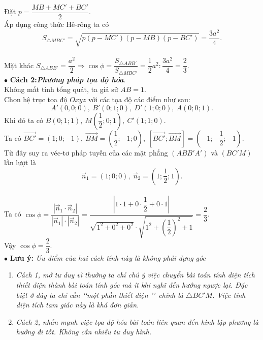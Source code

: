 \begin{ex}
{{}
\noindent
Đặt $p=\dfrac{MB+MC'+BC'}{2}$. \\
Áp dụng công thức Hê-rông ta có $$S_{\triangle MBC'}=\sqrt{p(p-MC')(p-MB)(p-BC')}=\dfrac{3a^2}{4}.$$
\\
Mặt khác $S_{\triangle ABB'}=\dfrac{a^2}{2}\Rightarrow \cos\phi =\dfrac{S_{\triangle ABB'}}{S_{\triangle MBC'}}=\dfrac{1}{2}a^2:\dfrac{3a^2}{4}=\dfrac{2}{3}$.\\
$\bullet$ \textbf{Cách 2:}\textbf{\textit{Phương pháp tọa độ hóa}}.\\
Không mất tính tổng quát, ta giả sử $AB=1$.\\
Chọn hệ trục tọa độ $Oxyz$ với các tọa độ các điểm như sau: $$A'(0,0;0),\ B'(0;1;0),\ D'(1;0;0),\ A(0;0;1).$$
Khi đó ta có $B(0;1;1),\ M\left(\dfrac{1}{2};0;1\right),\ C'(1;1;0)$.\\
Ta có $\overrightarrow{BC'}=(1;0;-1),\ \overrightarrow{BM}=\left(\dfrac{1}{2};-1;0\right),\ \left[\overrightarrow{BC'};\overrightarrow{BM}\right]=\left(-1;-\dfrac{1}{2};-1\right)$.\\
Từ đây suy ra véc-tơ pháp tuyến của các mặt phẳng $(ABB'A')$ và $(BC'M)$ lần lượt là $$\overrightarrow{n}_1=(1;0;0),\ \overrightarrow{n}_2=\left(1;\dfrac{1}{2};1\right).$$ \\
Ta có $\cos\phi =\dfrac{\left|\overrightarrow{n}_1\cdot\overrightarrow{n}_2\right|}{|\overrightarrow{n}_1|\cdot|\overrightarrow{n}_2|}=\dfrac{\left|1\cdot 1+0\cdot\dfrac{1}{2}+0\cdot 1\right|}{\sqrt{1^2+0^2+0^2}\cdot\sqrt{1^2+\left(\dfrac{1}{2}\right)^2+1}}=\dfrac{2}{3}$.\\
Vậy $\cos\phi=\dfrac{2}{3}$.\\
$\bullet$ \textbf{Lưu ý: }\textit{Ưu điểm của hai cách tính này là không phải dựng góc} 
\begin{enumerate}
\item \textit{Cách 1, mở tư duy vì thường ta chỉ chú ý việc chuyển bài toán tính diện tích thiết diện thành bài toán tính góc mà ít khi nghĩ đến hướng ngược lại. Đặc biệt ở đây ta chỉ cần \lq\lq một phần thiết diện \rq\rq\ chính là $\triangle BC'M$. Việc tính diện tích tam giác này là khá đơn giản.}
\item \textit{Cách 2, nhấn mạnh việc tọa độ hóa bài toán liên quan đến hình lập phương là hướng đi tốt. Không cần nhiều tư duy hình.}
\end{enumerate}}
 \end{ex}


